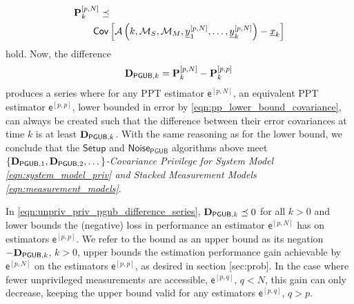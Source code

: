 \begin{equation}\label{eqn:pN_cov_bound}
  \begin{split}
    &{{\mathbf{P}}}_k^{[p,N]} \preceq\\
    &\qquad \mathsf{Cov}\left[\mathcal{A}\left(k,\mathcal{M}_S,\mathcal{M}_M,{\underline{y}}_1^{[p,N]},\dots,{\underline{y}}_k^{[p,N]}\right) - {\underline{x}}_k\right]
  \end{split}
\end{equation}
hold. Now, the difference
\begin{equation}\label{eqn:unpriv_priv_pgub_difference_series}
  {\ensuremath{{\mathbf{D}}}}_{\mathsf{PGUB},k} = {{\mathbf{P}}}_k^{[p,N]} - {{\mathbf{P}}}_k^{[p,p]}\,
\end{equation}
produces a series where for any PPT estimator $\mathsf{e}^{[p,N]}$, an equivalent PPT estimator $\mathsf{e}^{[p,p]}$, lower bounded in error by \eqref{eqn:pp_lower_bound_covariance}, can always be created such that the difference between their error covariances at time $k$ is at least ${{\mathbf{D}}}_{\mathsf{PGUB},k}$. With the same reasoning as for the lower bound, we conclude that the $\mathsf{Setup}$ and $\mathsf{Noise}_{\mathsf{PGUB}}$ algorithms above meet \textit{$\{{{\mathbf{D}}}_{\mathsf{PGUB},1},{{\mathbf{D}}}_{\mathsf{PGUB},2},\dots\}$-Covariance Privilege for System Model \eqref{eqn:system_model_priv} and Stacked Measurement Models \eqref{eqn:measurement_models}}.

In \eqref{eqn:unpriv_priv_pgub_difference_series}, ${{\mathbf{D}}}_{\mathsf{PGUB},k} \preceq 0$ for all $k>0$ and lower bounds the (negative) loss in performance an estimator $\mathsf{e}^{[p,N]}$ has on estimators $\mathsf{e}^{[p,p]}$. We refer to the bound as an upper bound as its negation $-{{\mathbf{D}}}_{\mathsf{PGUB},k}$, $k>0$, upper bounds the estimation performance gain achievable by $\mathsf{e}^{[p,N]}$ on the estimators $\mathsf{e}^{[p,p]}$, as desired in section [sec:prob]. In the case where fewer unprivileged measurements are accessible, $\mathsf{e}^{[p,q]}$, $q<N$, this gain can only decrease, keeping the upper bound valid for any estimators $\mathsf{e}^{[p,q]}$, $q>p$.

% 
% 

